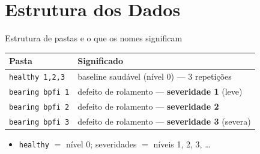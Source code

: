 \documentclass{beamer}
\begin{document}
\section{Estrutura dos Dados}

\begin{frame}[fragile]{Estrutura de pastas e o que os nomes significam}
\footnotesize
\normalsize
    \begin{tabular}{ll}
        \toprule
        \textbf{Pasta} & \textbf{Significado} \\
        \midrule
        \texttt{healthy 1,2,3} & baseline saudável (nível 0) --- 3 repetições \\
        \texttt{bearing bpfi 1} & defeito de rolamento --- \textbf{severidade 1} (leve) \\
        \texttt{bearing bpfi 2} & defeito de rolamento --- \textbf{severidade 2} \\
        \texttt{bearing bpfi 3} & defeito de rolamento --- \textbf{severidade 3} (severa) \\
        \bottomrule
    \end{tabular}
    \vspace{0.2cm}
    \begin{itemize}
        \item \texttt{healthy} $=$ nível 0; severidades $=$ níveis 1, 2, 3, \dots
    \end{itemize}
\end{frame}
\end{document}
